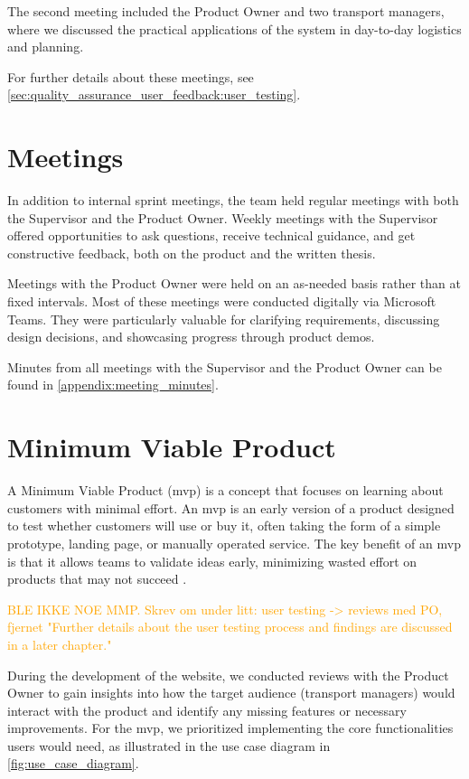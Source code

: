 The second meeting included the Product Owner and two transport managers, where we discussed the practical applications of the system in day-to-day logistics and planning.

For further details about these meetings, see \autoref{sec:quality_assurance_user_feedback:user_testing}.

\section{Meetings}

In addition to internal sprint meetings, the team held regular meetings with both the Supervisor and the Product Owner. Weekly meetings with the Supervisor offered opportunities to ask questions, receive technical guidance, and get constructive feedback, both on the product and the written thesis.

Meetings with the Product Owner were held on an as-needed basis rather than at fixed intervals. Most of these meetings were conducted digitally via Microsoft Teams. They were particularly valuable for clarifying requirements, discussing design decisions, and showcasing progress through product demos.

Minutes from all meetings with the Supervisor and the Product Owner can be found in \autoref{appendix:meeting_minutes}.

\section{Minimum Viable Product}

A Minimum Viable Product (\acrshort{mvp}) is a concept that focuses on learning about customers with minimal effort. An \acrshort{mvp} is an early version of a product designed to test whether customers will use or buy it, often taking the form of a simple prototype, landing page, or manually operated service. The key benefit of an \acrshort{mvp} is that it allows teams to validate ideas early, minimizing wasted effort on products that may not succeed \cite{agile_alliance_mvp}. 

\textcolor{orange}{BLE IKKE NOE MMP. Skrev om under litt: user testing -> reviews med PO, fjernet "Further details about the user testing process and findings are discussed in a later chapter."}

During the development of the website, we conducted reviews with the Product Owner to gain insights into how the target audience (transport managers) would interact with the product and identify any missing features or necessary improvements. For the \acrshort{mvp}, we prioritized implementing the core functionalities users would need, as illustrated in the use case diagram in \autoref{fig:use_case_diagram}.

